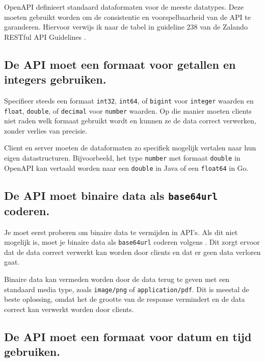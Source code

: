 OpenAPI definieert standaard dataformaten voor de meeste datatypes. Deze moeten gebruikt worden om de consistentie en voorspelbaarheid van de API te garanderen. Hiervoor verwijs ik naar de tabel in guideline 238 van de Zalando RESTful API Guidelines \autocite{ZAG2024}.

\subsection{De API moet een formaat voor getallen en integers gebruiken.}
\label{section:formaat_getallen_integers}

Specifieer steeds een formaat \texttt{int32}, \texttt{int64}, of \texttt{bigint} voor \texttt{integer} waarden en \texttt{float}, \texttt{double}, of \texttt{decimal} voor \texttt{number} waarden. Op die manier moeten clients niet raden welk formaat gebruikt wordt en kunnen ze de data correct verwerken, zonder verlies van precisie.

\bigskip

Client en server moeten de dataformaten zo specifiek mogelijk vertalen naar hun eigen datastructuren. Bijvoorbeeld, het type \texttt{number} met formaat \texttt{double} in OpenAPI kan vertaald worden naar een \texttt{double} in Java of een \texttt{float64} in Go.

\subsection{De API moet binaire data als \texttt{base64url} coderen.}
\label{section:binaire_data_base64url}

Je moet eerst proberen om binaire data te vermijden in API's. Als dit niet mogelijk is, moet je binaire data als \texttt{base64url} coderen volgens \textcite{rfc7493}. Dit zorgt ervoor dat de data correct verwerkt kan worden door clients en dat er geen data verloren gaat.

Binaire data kan vermeden worden door de data terug te geven met een standaard media type, zoals \texttt{image/png} of \texttt{application/pdf}. Dit is meestal de beste oplossing, omdat het de grootte van de response vermindert en de data correct kan verwerkt worden door clients.

\subsection{De API moet een formaat voor datum en tijd gebruiken.}
\label{section:formaat_datum_tijd}

